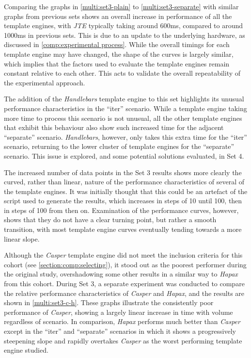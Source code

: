 Comparing the graphs in \autoref{multi:set3-plain} to \autoref{multi:set3-separate} with similar graphs from previous sets shows an overall increase in performance of all the \gls{template engine}s, with \emph{JTE} typically taking around 600ms, compared to around 1000ms in previous sets. This is due to an update to the underlying hardware, as discussed in \autoref{comp:experimental process}. While the overall timings for each \gls{template engine} may have changed, the shape of the curves is largely similar, which implies that the factors used to evaluate the \gls{template engine}s remain constant relative to each other. This acts to validate the overall repeatability of the experimental approach.

The addition of the \emph{Handlebars} \gls{template engine} to this set highlights its unusual performance characteristics in the \enquote{iter} scenario. While a \gls{template engine} taking more time to process this scenario is not unusual, all the other \gls{template engine}s that exhibit this behaviour also show such increased time for the adjacent \enquote{separate} scenario. \emph{Handlebars}, however, only takes this extra time for the \enquote{iter} scenario, returning to the lower cluster of \gls{template engine}s for the \enquote{separate} scenario. This issue is explored, and some potential solutions evaluated, in Set 4.

The increased number of data points in the Set 3 results shows more clearly the curved, rather than linear, nature of the performance characteristics of several of the \gls{template engine}s. It was initially thought that this could be an artefact of the script used to generate the results, which increases in steps of 10 until 100, then in steps of 100 from then on. Examination of the performance curves, however, shows that they do not have a clear turning point, but rather a smooth transition, with most \gls{template engine} curves eventually tending towards a more linear slope.

Although the \emph{Casper} \gls{template engine} did not meet the inclusion criteria for this cohort (see \autoref{section:comp:selecting}), it stood out as the poorest performer during the original study, overshadowing some other results in a similar way to \emph{Hapax} from this cohort. During Set 3, a separate experiment was conducted to compare the relative performance characteristics of \emph{Casper} and \emph{Hapax}, and the results are shown in \autoref{multi:set3-c-h}. These graphs illustrate the consistently poor performance of \emph{Casper}, showing a largely linear increase in time with volume regardless of scenario. In comparison, \emph{Hapax} performs much better than \emph{Casper} except in the \enquote{iter} and \enquote{separate} scenarios in which it shows a progressively steepening slope and rapidly overtakes \emph{Casper} as the worst performing \gls{template engine} studied.

